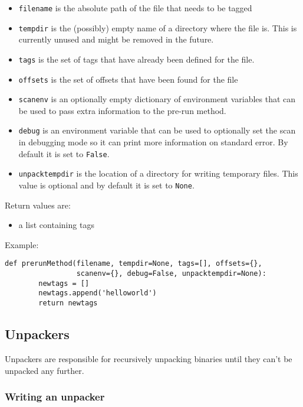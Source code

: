 \documentclass[10pt]{article}
\begin{document}
\begin{itemize}
\item \texttt{filename} is the absolute path of the file that needs to be tagged
\item \texttt{tempdir} is the (possibly) empty name of a directory where the
file is. This is currently unused and might be removed in the future.
\item \texttt{tags} is the set of tags that have already been defined for the
file.
\item \texttt{offsets} is the set of offsets that have been found for the file
\item \texttt{scanenv} is an optionally empty dictionary of environment variables
that can be used to pass extra information to the pre-run method.
\item \texttt{debug} is an environment variable that can be used to optionally
set the scan in debugging mode so it can print more information on standard
error. By default it is set to \texttt{False}.
\item \texttt{unpacktempdir} is the location of a directory for writing
temporary files. This value is optional and by default it is set to
\texttt{None}.
\end{itemize}

Return values are:

\begin{itemize}
\item a list containing tags
\end{itemize}

Example:

\begin{verbatim}
def prerunMethod(filename, tempdir=None, tags=[], offsets={},
                 scanenv={}, debug=False, unpacktempdir=None):
        newtags = []
        newtags.append('helloworld')
        return newtags
\end{verbatim}

\subsection{Unpackers}

Unpackers are responsible for recursively unpacking binaries until they
can't be unpacked any further.

\subsubsection{Writing an unpacker}
\end{document}
